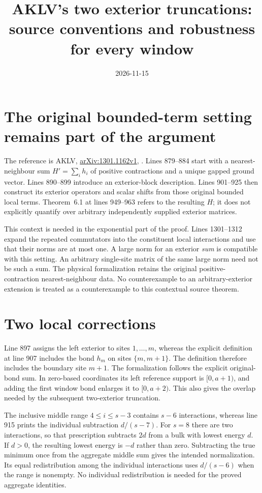 \documentclass{article}
\title{AKLV's two exterior truncations: source conventions and robustness for every window}
\author{}
\date{2026-11-15}
\begin{document}
\maketitle
{}

\section{The original bounded-term setting remains part of the argument}

The reference is AKLV, \href{https://arxiv.org/abs/1301.1162v1}{arXiv:1301.1162v1},
. Lines 879--884 start with a nearest-neighbour sum
$H'=\sum_i h_i$ of positive contractions and a unique gapped ground vector.
Lines 890--899 introduce an exterior-block description. Lines 901--925 then
construct its exterior operators and scalar shifts from those original
bounded local terms. Theorem~6.1 at lines 949--963 refers to the resulting
$H$; it does not explicitly quantify over arbitrary independently supplied
exterior matrices.

This context is needed in the exponential part of the proof. Lines
1301--1312 expand the repeated commutators into the constituent local
interactions and use that their norms are at most one. A large norm for
an exterior \emph{sum} is compatible with this setting. An arbitrary
single-site matrix of the same large norm need not be such a sum.
The physical formalization retains the original positive-contraction
nearest-neighbour data. No counterexample to an arbitrary-exterior
extension is treated as a counterexample to this contextual source theorem.

\section{Two local corrections}

Line 897 assigns the left exterior to sites $1,\ldots,m$, whereas the
explicit definition at line 907 includes the bond $h_m$ on sites
$\{m,m+1\}$. The definition therefore includes the boundary site $m+1$.
The formalization follows the explicit original-bond sum. In zero-based
coordinates its left reference support is $[0,a+1)$, and adding the first
window bond enlarges it to $[0,a+2)$. This also gives the overlap needed
by the subsequent two-exterior truncation.

The inclusive middle range $4\le i\le s-3$ contains $s-6$ interactions,
whereas line 915 prints the individual subtraction $d/(s-7)$. For $s=8$
there are two interactions, so that prescription subtracts $2d$ from a
bulk with lowest energy $d$. If $d>0$, the resulting lowest energy is
$-d$ rather than zero. Subtracting the true minimum once from the aggregate
middle sum gives the intended normalization. Its equal redistribution
among the individual interactions uses $d/(s-6)$ when the range is nonempty.
No individual redistribution is needed for the proved aggregate identities.
\end{document}
